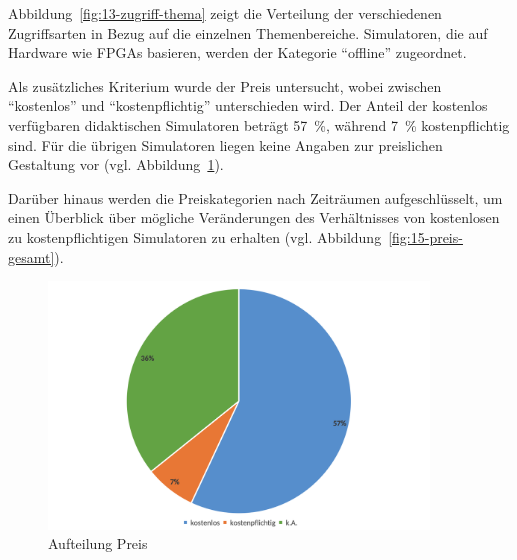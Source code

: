 Abbildung~\ref{fig:13-zugriff-thema} zeigt die Verteilung der verschiedenen Zugriffsarten in Bezug auf die einzelnen Themenbereiche. Simulatoren, die auf Hardware wie \ac{FPGA}s basieren, werden der Kategorie \enquote{offline} zugeordnet.

Als zusätzliches Kriterium wurde der Preis untersucht, wobei zwischen \enquote{kostenlos} und \enquote{kostenpflichtig} unterschieden wird. Der Anteil der kostenlos verfügbaren didaktischen Simulatoren beträgt 57~\%, während 7~\% kostenpflichtig sind. Für die übrigen Simulatoren liegen keine Angaben zur preislichen Gestaltung vor (vgl. Abbildung~\ref{fig:14-preis2}). 

Darüber hinaus werden die Preiskategorien nach Zeiträumen aufgeschlüsselt, um einen Überblick über mögliche Veränderungen des Verhältnisses von kostenlosen zu kostenpflichtigen Simulatoren zu erhalten (vgl. Abbildung~\ref{fig:15-preis-gesamt}).

\begin{figure}[!htbp]
    \centering
    \includegraphics[width=0.9\textwidth]{graphics_lit/14-preis.png}
    \caption{Aufteilung Preis}
    \label{fig:14-preis2}
\end{figure}

